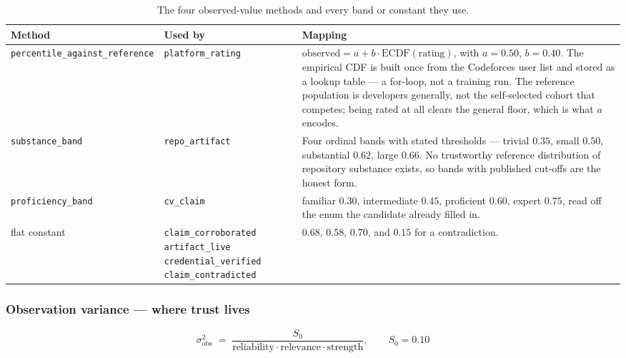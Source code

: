 \documentclass[11pt,a4paper]{article}
\newenvironment{keyeq}{%
  \begin{shaded}
  \centering
}{%
  \end{shaded}
}
\begin{document}
\begin{table}[H]
\centering\small
\begin{tabular}{@{}L{3.0cm}L{2.6cm}L{9.3cm}@{}}
\toprule
\textbf{Method} & \textbf{Used by} & \textbf{Mapping} \\
\midrule
\texttt{percentile\_\allowbreak against\_\allowbreak reference} &
\texttt{platform\_\allowbreak rating} &
$\text{observed} = a + b\cdot\text{ECDF}(\text{rating})$, with $a=0.50$,
$b=0.40$. The empirical CDF is built once from the Codeforces user list and
stored as a lookup table --- a for-loop, not a training run. The reference
population is developers generally, not the self-selected cohort that
competes; being rated at all clears the general floor, which is what $a$
encodes. \\[6pt]
\texttt{substance\_\allowbreak band} & \texttt{repo\_\allowbreak artifact} &
Four ordinal bands with stated thresholds --- trivial $0.35$, small $0.50$,
substantial $0.62$, large $0.66$. No trustworthy reference distribution of
repository substance exists, so bands with published cut-offs are the
honest form. \\[6pt]
\texttt{proficiency\_\allowbreak band} & \texttt{cv\_\allowbreak claim} &
familiar $0.30$, intermediate $0.45$, proficient $0.60$, expert $0.75$,
read off the enum the candidate already filled in. \\[6pt]
flat constant &
\texttt{claim\_\allowbreak corroborated}\newline
\texttt{artifact\_\allowbreak live}\newline
\texttt{credential\_\allowbreak verified}\newline
\texttt{claim\_\allowbreak contradicted} &
$0.68$, $0.58$, $0.70$, and $0.15$ for a contradiction. \\
\bottomrule
\end{tabular}
\caption{The four observed-value methods and every band or constant they use.}
\end{table}

\subsubsection*{Observation variance --- where trust lives}

\begin{keyeq}
\[
\sigma^2_{\text{obs}} \;=\; \frac{S_0}{\text{reliability}\cdot\text{relevance}\cdot\text{strength}},
\qquad S_0 = 0.10
\]
\end{keyeq}
\end{document}
